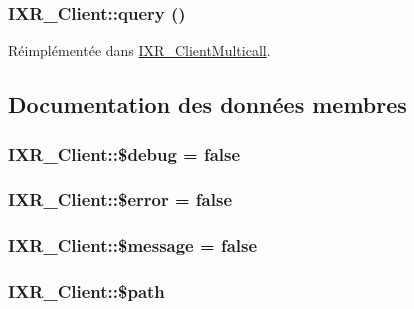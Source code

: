 \hypertarget{classIXR__Client_a1}{
\subsubsection[query]{\setlength{\rightskip}{0pt plus 5cm}IXR\_\-Client::query ()}}
\label{classIXR__Client_a1}




R\'{e}impl\'{e}ment\'{e}e dans \hyperlink{classIXR__ClientMulticall_a2}{IXR\_\-Client\-Multicall}.

\subsection{Documentation des donn\'{e}es membres}
\hypertarget{classIXR__Client_o6}{
\subsubsection[\$debug]{\setlength{\rightskip}{0pt plus 5cm}IXR\_\-Client::\$debug = false}}
\label{classIXR__Client_o6}


\hypertarget{classIXR__Client_o7}{
\subsubsection[\$error]{\setlength{\rightskip}{0pt plus 5cm}IXR\_\-Client::\$error = false}}
\label{classIXR__Client_o7}


\hypertarget{classIXR__Client_o5}{
\subsubsection[\$message]{\setlength{\rightskip}{0pt plus 5cm}IXR\_\-Client::\$message = false}}
\label{classIXR__Client_o5}


\hypertarget{classIXR__Client_o2}{
\subsubsection[\$path]{\setlength{\rightskip}{0pt plus 5cm}IXR\_\-Client::\$path}}
\label{classIXR__Client_o2}


